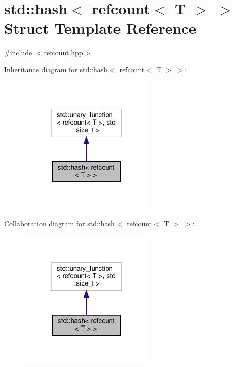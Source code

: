\hypertarget{structstd_1_1hash_3_01refcount_3_01T_01_4_01_4}{}\section{std\+:\+:hash$<$ refcount$<$ T $>$ $>$ Struct Template Reference}
\label{structstd_1_1hash_3_01refcount_3_01T_01_4_01_4}


{\ttfamily \#include $<$refcount.\+hpp$>$}



Inheritance diagram for std\+:\+:hash$<$ refcount$<$ T $>$ $>$\+:
\nopagebreak
\begin{figure}[H]
\begin{center}
\leavevmode
\includegraphics[width=184pt]{dc/dde/structstd_1_1hash_3_01refcount_3_01T_01_4_01_4__inherit__graph}
\end{center}
\end{figure}


Collaboration diagram for std\+:\+:hash$<$ refcount$<$ T $>$ $>$\+:
\nopagebreak
\begin{figure}[H]
\begin{center}
\leavevmode
\includegraphics[width=184pt]{da/df0/structstd_1_1hash_3_01refcount_3_01T_01_4_01_4__coll__graph}
\end{center}
\end{figure}

